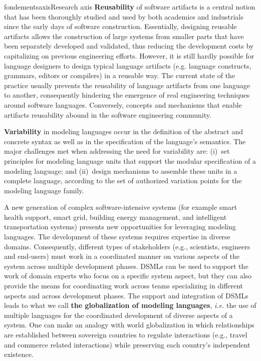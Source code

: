 \documentclass{ra2018}
\begin{document}
\begin{module}{fondements}{axis}{Research axis}
\textbf{Reusability} of software artifacts is a central notion that has been thoroughly studied and used by both academics and industrials since the early days of software construction. Essentially, designing reusable artifacts allows the construction of large systems from smaller parts that have been separately developed and validated, thus reducing the development costs by capitalizing on previous engineering efforts.
%
However, it is still hardly possible for language designers to design typical language artifacts (e.g. language constructs, grammars, editors or compilers) in a reusable way. The current state of the practice usually prevents the reusability of language artifacts from one language to another, consequently hindering the emergence of real engineering techniques around software languages.
Conversely, concepts and mechanisms that enable artifacts reusability abound in the software engineering community. 

\textbf{Variability} in modeling languages occur in the definition of the abstract and concrete syntax as well as in the specification of the language's semantics. 
The major challenges met when addressing the need for variability are: (i)~set principles for modeling language units that support the modular specification of a modeling language; and (ii)~design mechanisms to assemble these units in a complete language, according to the set of authorized variation points for the modeling language family.


A new generation of complex software-intensive systems (for example smart health support, smart grid, building energy management, and intelligent transportation systems) presents new opportunities for leveraging modeling languages. The development of these systems requires expertise in diverse domains.
Consequently, different types of stakeholders (e.g., scientists, engineers and end-users) must work in a coordinated manner on various aspects of the system across multiple development phases. DSMLs can be used to support the work of domain experts who focus on a specific system aspect, but they can also provide the means for coordinating work across teams specializing in different aspects and across development phases. The support and integration of DSMLs leads to what we call \textbf{the globalization of modeling languages}, \textit{i.e.} the use of multiple languages for the coordinated development of diverse aspects of a system. One can make an analogy with world globalization in which relationships are established between sovereign countries to regulate interactions (e.g., travel and commerce related interactions) while preserving each country's independent existence.



\end{module}
\end{document}
